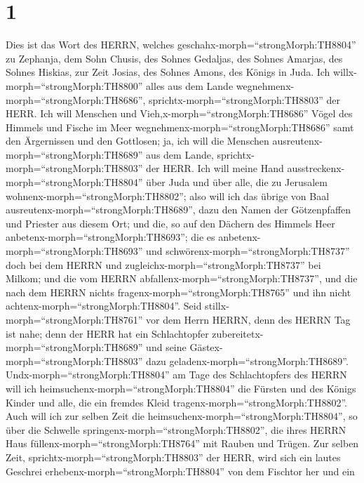\hypertarget{section}{%
\section{1}\label{section}}

 Dies ist das Wort des HERRN, welches
geschahx-morph=``strongMorph:TH8804'' zu Zephanja, dem Sohn Chusis, des
Sohnes Gedaljas, des Sohnes Amarjas, des Sohnes Hiskias, zur Zeit
Josias, des Sohnes Amons, des Königs in Juda.  Ich
willx-morph=``strongMorph:TH8800'' alles aus dem Lande
wegnehmenx-morph=``strongMorph:TH8686'',
sprichtx-morph=``strongMorph:TH8803'' der HERR.  Ich will
Menschen und Vieh,x-morph=``strongMorph:TH8686'' Vögel des Himmels und
Fische im Meer wegnehmenx-morph=``strongMorph:TH8686'' samt den
Ärgernissen und den Gottlosen; ja, ich will die Menschen
ausreutenx-morph=``strongMorph:TH8689'' aus dem Lande,
sprichtx-morph=``strongMorph:TH8803'' der HERR.  Ich will
meine Hand ausstreckenx-morph=``strongMorph:TH8804'' über Juda und über
alle, die zu Jerusalem wohnenx-morph=``strongMorph:TH8802''; also will
ich das übrige von Baal ausreutenx-morph=``strongMorph:TH8689'', dazu
den Namen der Götzenpfaffen und Priester aus diesem Ort; 
und die, so auf den Dächern des Himmels Heer
anbetenx-morph=``strongMorph:TH8693''; die es
anbetenx-morph=``strongMorph:TH8693'' und
schwörenx-morph=``strongMorph:TH8737'' doch bei dem HERRN und
zugleichx-morph=``strongMorph:TH8737'' bei Milkom;  und die
vom HERRN abfallenx-morph=``strongMorph:TH8737'', und die nach dem HERRN
nichts fragenx-morph=``strongMorph:TH8765'' und ihn nicht
achtenx-morph=``strongMorph:TH8804''.  Seid
stillx-morph=``strongMorph:TH8761'' vor dem Herrn HERRN, denn des HERRN
Tag ist nahe; denn der HERR hat ein Schlachtopfer
zubereitetx-morph=``strongMorph:TH8689'' und seine
Gästex-morph=``strongMorph:TH8803'' dazu
geladenx-morph=``strongMorph:TH8689''. 
Undx-morph=``strongMorph:TH8804'' am Tage des Schlachtopfers des HERRN
will ich heimsuchenx-morph=``strongMorph:TH8804'' die Fürsten und des
Königs Kinder und alle, die ein fremdes Kleid
tragenx-morph=``strongMorph:TH8802''.  Auch will ich zur
selben Zeit die heimsuchenx-morph=``strongMorph:TH8804'', so über die
Schwelle springenx-morph=``strongMorph:TH8802'', die ihres HERRN Haus
füllenx-morph=``strongMorph:TH8764'' mit Rauben und Trügen.
 Zur selben Zeit, sprichtx-morph=``strongMorph:TH8803'' der
HERR, wird sich ein lautes Geschrei
erhebenx-morph=``strongMorph:TH8804'' von dem Fischtor her und ein
